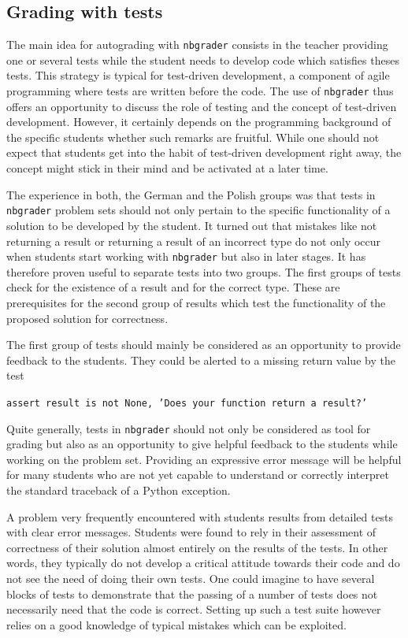 \documentclass[twocolumn]{svjour3}          %
\begin{document}
\subsection{Grading with tests}

The main idea for autograding with \texttt{nbgrader} consists in the teacher
providing one or several tests while the student needs to develop code which
satisfies theses tests. This strategy is typical for test-driven development,
a component of agile programming where tests are written before the code.
The use of \texttt{nbgrader} thus offers an opportunity to discuss the role
of testing and the concept of test-driven development. However, it certainly
depends on the programming background of the specific students whether such
remarks are fruitful. While one should not expect that students get into the
habit of test-driven development right away, the concept might stick in their
mind and be activated at a later time.

The experience in both, the German and the Polish groups was that tests in
\texttt{nbgrader} problem sets should not only pertain to the specific
functionality of a solution to be developed by the student. It turned out
that mistakes like not returning a result or returning a result of an incorrect
type do not only occur when students start working with \texttt{nbgrader} but
also in later stages. It has therefore proven useful to separate tests into
two groups. The first groups of tests check for the existence of a result
and for the correct type. These are prerequisites for the second group of results
which test the functionality of the proposed solution for correctness.

The first group of tests should mainly be considered as an opportunity to
provide feedback to the students. They could be alerted to a missing return
value by the test

\noindent\texttt{assert result is not None, 'Does your function return
a result?'}

Quite generally, tests in \texttt{nbgrader} should not only be considered as
tool for grading but also as an opportunity to give helpful feedback to the
students while working on the problem set. Providing an expressive error
message will be helpful for many students who are not yet capable to understand
or correctly interpret the standard traceback of a Python exception. 

A problem very frequently encountered with students results from detailed 
tests with clear error messages. Students were found to rely in their assessment
of correctness of their solution almost entirely on the results of the tests.
In other words, they typically do not develop a critical attitude towards their
code and do not see the need of doing their own tests. One could imagine to
have several blocks of tests to demonstrate that the passing of a number of
tests does not necessarily need that the code is correct. Setting up such a
test suite however relies on a good knowledge of typical mistakes which can
be exploited.
\end{document}

